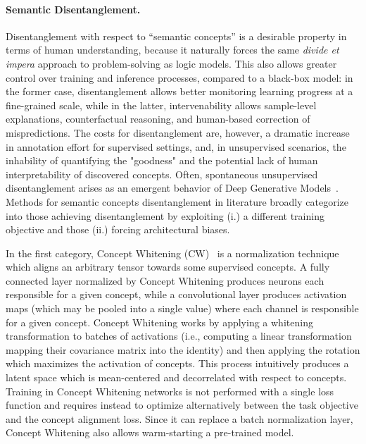 \paragraph{Semantic Disentanglement.} Disentanglement with respect to ``semantic concepts'' is a desirable property in terms of human understanding, because it naturally forces the same \textit{divide et impera} approach to problem-solving as logic models. This also allows greater control over training and inference processes, compared to a black-box model: in the former case, disentanglement allows better monitoring learning progress at a fine-grained scale, while in the latter, intervenability allows sample-level explanations, counterfactual reasoning, and human-based correction of mispredictions.
The costs for disentanglement are, however, a dramatic increase in annotation effort for supervised settings, and, in unsupervised scenarios, the inhability of quantifying the "goodness" and the potential lack of human interpretability of discovered concepts. Often, spontaneous unsupervised disentanglement arises as an emergent behavior of Deep Generative Models~\cite{gat2022latent}. %
%
Methods for semantic concepts disentanglement in literature broadly categorize into those achieving disentanglement by exploiting (i.) a different training objective and those (ii.) forcing architectural biases.

In the first category, Concept Whitening (CW)~\cite{chen2020concept} is a normalization technique which aligns an arbitrary tensor towards some supervised concepts. A fully connected layer normalized by Concept Whitening produces neurons each responsible for a given concept, while a convolutional layer produces activation maps (which may be pooled into a single value) where each channel is responsible for a given concept. Concept Whitening works by applying a whitening transformation to batches of activations (i.e., computing a linear transformation mapping their covariance matrix into the identity) and then applying the rotation which maximizes the activation of concepts. This process intuitively produces a latent space which is mean-centered and decorrelated with respect to concepts. Training in Concept Whitening networks is not performed with a single loss function and requires instead to optimize alternatively between the task objective and the concept alignment loss. Since it can replace a batch normalization layer, Concept Whitening also allows warm-starting a pre-trained model.

